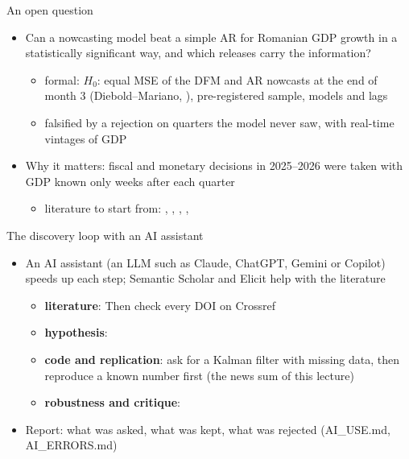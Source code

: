 \begin{frame}{An open question}
\itemsize{\small}
\begin{itemize}
    \item Can a nowcasting model beat a simple AR for Romanian GDP growth in a statistically significant way, and which releases carry the information?
    \begin{itemize}
        \item formal: $H_0$: equal MSE of the DFM and AR nowcasts at the end of month 3 (Diebold--Mariano, ), pre-registered sample, models and lags
        \item falsified by a rejection on quarters the model never saw, with real-time vintages of GDP
    \end{itemize}
    \item Why it matters: fiscal and monetary decisions in 2025--2026 were taken with GDP known only weeks after each quarter
    \begin{itemize}
        \item literature to start from: , , , , 
    \end{itemize}
\end{itemize}
\end{frame}

\begin{frame}{The discovery loop with an AI assistant}
\itemsize{\footnotesize}
\begin{itemize}
    \item An AI assistant (an LLM such as Claude, ChatGPT, Gemini or Copilot) speeds up each step; Semantic Scholar and Elicit help with the literature
    \begin{itemize}
        \item \textbf{literature}:  Then check every DOI on Crossref
        \item \textbf{hypothesis}: 
        \item \textbf{code and replication}: ask for a Kalman filter with missing data, then reproduce a known number first (the news sum of this lecture)
        \item \textbf{robustness and critique}: 
    \end{itemize}
    \item Report: what was asked, what was kept, what was rejected (AI\_USE.md, AI\_ERRORS.md)
\end{itemize}
\end{frame}

